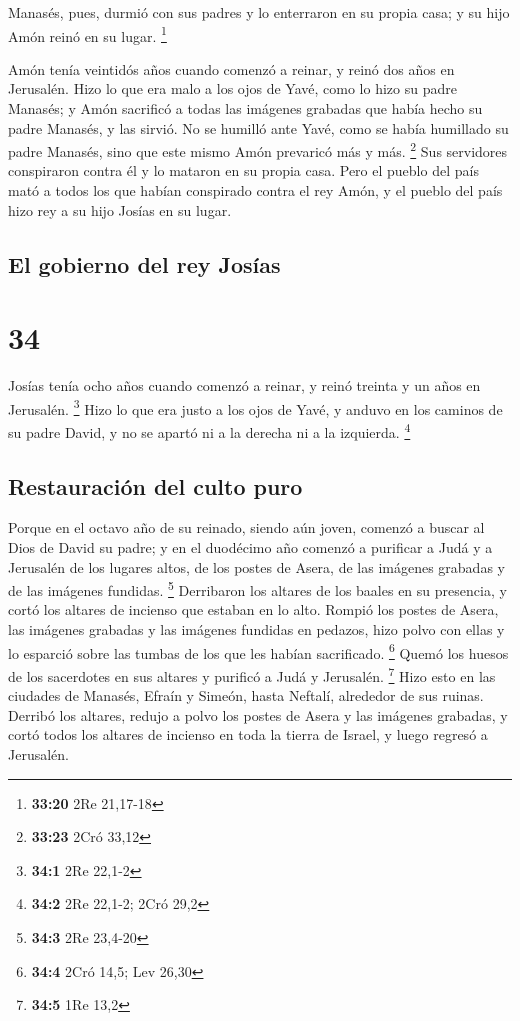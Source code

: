  Manasés, pues, durmió con sus padres y lo enterraron en
su propia casa; y su hijo Amón reinó en su lugar. \footnote{\textbf{33:20}
  2Re 21,17-18}

 Amón tenía veintidós años cuando comenzó a reinar, y
reinó dos años en Jerusalén.  Hizo lo que era malo a los
ojos de Yavé, como lo hizo su padre Manasés; y Amón sacrificó a todas
las imágenes grabadas que había hecho su padre Manasés, y las sirvió.
 No se humilló ante Yavé, como se había humillado su
padre Manasés, sino que este mismo Amón prevaricó más y más. \footnote{\textbf{33:23}
  2Cró 33,12}  Sus servidores conspiraron contra él y lo
mataron en su propia casa.  Pero el pueblo del país mató
a todos los que habían conspirado contra el rey Amón, y el pueblo del
país hizo rey a su hijo Josías en su lugar.

\hypertarget{el-gobierno-del-rey-josuxedas}{%
\subsection{El gobierno del rey
Josías}\label{el-gobierno-del-rey-josuxedas}}

\hypertarget{section-33}{%
\section{34}\label{section-33}}

 Josías tenía ocho años cuando comenzó a reinar, y reinó
treinta y un años en Jerusalén. \footnote{\textbf{34:1} 2Re 22,1-2}
 Hizo lo que era justo a los ojos de Yavé, y anduvo en los
caminos de su padre David, y no se apartó ni a la derecha ni a la
izquierda. \footnote{\textbf{34:2} 2Re 22,1-2; 2Cró 29,2}

\hypertarget{restauraciuxf3n-del-culto-puro}{%
\subsection{Restauración del culto
puro}\label{restauraciuxf3n-del-culto-puro}}

 Porque en el octavo año de su reinado, siendo aún joven,
comenzó a buscar al Dios de David su padre; y en el duodécimo año
comenzó a purificar a Judá y a Jerusalén de los lugares altos, de los
postes de Asera, de las imágenes grabadas y de las imágenes fundidas.
\footnote{\textbf{34:3} 2Re 23,4-20}  Derribaron los
altares de los baales en su presencia, y cortó los altares de incienso
que estaban en lo alto. Rompió los postes de Asera, las imágenes
grabadas y las imágenes fundidas en pedazos, hizo polvo con ellas y lo
esparció sobre las tumbas de los que les habían sacrificado. \footnote{\textbf{34:4}
  2Cró 14,5; Lev 26,30}  Quemó los huesos de los
sacerdotes en sus altares y purificó a Judá y Jerusalén. \footnote{\textbf{34:5}
  1Re 13,2}  Hizo esto en las ciudades de Manasés, Efraín
y Simeón, hasta Neftalí, alrededor de sus ruinas.  Derribó
los altares, redujo a polvo los postes de Asera y las imágenes grabadas,
y cortó todos los altares de incienso en toda la tierra de Israel, y
luego regresó a Jerusalén.

